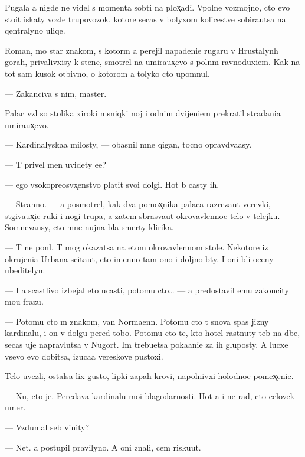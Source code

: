 \documentclass[10pt]{book}
\begin{document}
Pugala {\y}a nigde ne videl s momenta sob{\yi}ti{\y} na plox̨adi. Vpolne vozmojno, cto {\y}evo sto{\y}it iskaty vozle trupovozok, kotor{\yi}{\y}e se{\y}cas v bolyxom kolicestve sobira{\y}utsa na qentralyno{\y} uliqe.

Roman, mo{\y} star{\yi}{\y} znakom{\yi}{\y}, s kotor{\yi}m {\y}a perejil napadeni{\y}e rugaru v Hrustalyn{\yi}h gorah, privalivxisy k stene, smotrel na umira{\y}ux̨evo s poln{\yi}m ravnoduxi{\y}em. Kak na tot sam{\yi}{\y} kusok otbivno{\y}, o kotorom {\y}a tolyko cto upom{\ia}nul.

— Zakanciva{\y} s nim, master.

Palac vz{\ia}l so stolika xiroki{\y} m{\ia}sniqki{\y} noj i odnim dvijeni{\y}em prekratil stradani{\y}a umira{\y}ux̨evo.

— Kardinalyska{\y}a milosty, — ob{\y}asnil mne qigan, tocno opravd{\yi}va{\y}asy.

— T{\yi} privel men{\ia} uvidety {\y}e{\y}e?

— {\Y}ego v{\yi}sokopreosv{\ia}x̨enstvo platit svo{\y}i dolgi. Hot{\ia} b{\yi} casty ih.

— Stranno. — {\Y}a posmotrel, kak dva pomox̨nika palaca razreza{\y}ut verevki, st{\ia}giva{\y}ux̨i{\y}e ruki i nogi trupa, a zatem sbras{\yi}va{\y}ut okrovavlenno{\y}e telo v telejku. — Somneva{\y}usy, cto mne nujna b{\yi}la smerty klirika.

— T{\yi} ne pon{\ia}l. T{\yi} mog okazatsa na etom okrovavlennom stole. Nekotor{\yi}{\y}e iz okrujeni{\y}a Urbana scita{\y}ut, cto imenno tam ono i doljno b{\yi}ty. I oni b{\yi}li oceny ubeditelyn{\yi}.

— I {\y}a scastlivo izbejal eto{\y} ucasti, potomu cto… — {\Y}a predostavil {\y}emu zakoncity mo{\y}u frazu.

— Potomu cto m{\yi} znakom{\yi}, van Norma{\y}enn. Potomu cto t{\yi} snova spas jizny kardinalu, i on v dolgu pered tobo{\y}. Potomu cto te, kto hotel rast{\ia}nuty teb{\ia} na d{\yi}be, se{\y}cas uje napravl{\ia}{\y}utsa v N{\y}ugort. Im trebu{\y}etsa poka{\y}ani{\y}e za ih gluposty. A lucxe vsevo {\y}evo dobitsa, izuca{\y}a vereskov{\yi}{\y}e pustoxi.

Telo uvezli, ostalsa lix gusto{\y}, lipki{\y} zapah krovi, napolnivxi{\y} holodno{\y}e pomex̨eni{\y}e.

— Nu, cto je. Peredava{\y} kardinalu mo{\y}i blagodarnosti. Hot{\ia} {\y}a i ne rad, cto celovek umer.

— Vzdumal seb{\ia} vinity?

— Net. {\Y}a postupil pravilyno. A oni znali, cem risku{\y}ut.
\end{document}
